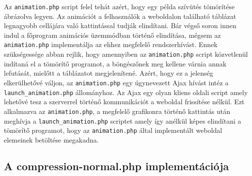 \documentclass[oneside,titlepage,12pt,a4paper]{report}
\begin{document}
\par Az \texttt{animation.php} script felel tehát azért, hogy egy példa szívütés tömörítése ábrázolva legyen. Az animációt a felhasználók a weboldalon található táblázat legnagyobb cellájára való kattintással tudják elindítani. Bár végső soron innen indul a főprogram animációs üzemmódban történő elindítása, mégsem az \texttt{animation.php} implementálja az ehhez megfelelő rendszerhívást. Ennek szükségessége abban rejlik, hogy amennyiben az \texttt{animation.php} script közvetlenül indítaná el a tömörítő programot, a böngészőnek meg kellene várnia annak lefutását, mielőtt a táblázatot megjelenítené. Azért, hogy ez a jelenség elkerülhetővé váljon, az \texttt{animation.php} egy úgynevezett Ajax hívást intéz a \texttt{launch\_animation.php} állományhoz. Az Ajax egy olyan kliens oldali script amely lehetővé tesz a szerverrel történő kommunikációt a weboldal frissítése nélkül. Ezt alkalmazva az \texttt{animation.php}, a megfelelő grafikonra történő kattintás után meghívja a \texttt{launch\_animation.php} scriptet amely így anélkül képes elindítani a tömörítő programot, hogy az \texttt{animation.php} által implementált weboldal elemeinek betöltése megakadna.  

\subsection{A compression-normal.php implementációja }
\end{document}
